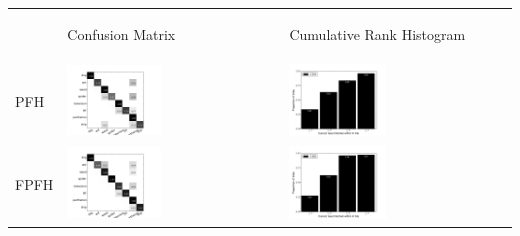 
\begin{table}
\centering
\begin{tabular}{m{} m{} m{}}
  & \begin{center} Confusion Matrix \end{center} & \begin{center} Cumulative Rank Histogram \end{center} \\
  PFH & \includegraphics[width=0.45\textwidth,clip=true]{../figures/PSB/PFH_confmat.png} & \includegraphics[width=0.45\textwidth,clip=true]{../figures/PSB/PFH_rankhist.png} \\
  FPFH & \includegraphics[width=0.45\textwidth,clip=true]{../figures/PSB/FPFH_confmat.png} & \includegraphics[width=0.45\textwidth,clip=true]{../figures/PSB/FPFH_rankhist.png} \\

\end{tabular}
\end{table}
